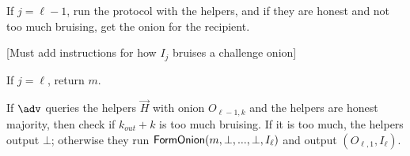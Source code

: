 If $j = \ell-1$, run the protocol with the helpers, and if they are honest and not too much bruising, get the onion for the recipient.  

[Must add instructions for how $I_j$ bruises a challenge onion]

If $j = \ell$, return $m$.

If $\adv$ queries the helpers $\vec{H}$ with onion $O_{\ell-1,k}$ and the helpers are honest majority, then check if $k_{\mathit{out}}+k$ is too much bruising.  If it is too much, the helpers output $\bot$; otherwise they run $\mathsf{FormOnion}(m,\bot,...,\bot,I_\ell)$ and output $(O_{\ell,1},I_\ell)$.

\fi